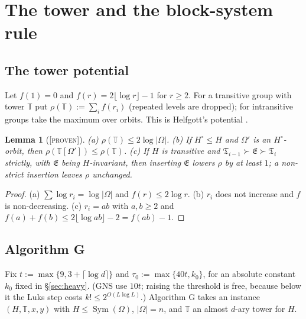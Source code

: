 \documentclass[11pt]{article}
\newtheorem{lemma}[theorem]{Lemma}
\theoremstyle{definition}
\theoremstyle{remark}
\newcommand{\Sym}{\operatorname{Sym}}
\newcommand{\T}{\mathbb T}
\newcommand{\fT}{\mathfrak T}
\newcommand{\fE}{\mathfrak E}
\newcommand{\Proven}{\textsc{[proven]}}
\begin{document}
\section{The tower and the block-system rule}\label{sec:tower}

\subsection{The tower potential}

Let $f(1)=0$ and $f(r)=2\lfloor\log r\rfloor-1$ for $r\ge2$. For a transitive group with tower $\T$ put $\rho(\T):=\sum_i f(r_i)$ (repeated levels are dropped); for intransitive groups take the maximum over orbits. This is Helfgott's potential \cite[Appendix]{HBD}.

\begin{lemma}[\Proven]\label{lem:rho}
\textup{(a)} $\rho(\T)\le 2\log|\Omega|$. \textup{(b)} If $H^\circ\le H$ and $\Omega'$ is an $H^\circ$-orbit, then $\rho(\T[\Omega'])\le\rho(\T)$. \textup{(c)} If $H$ is transitive and $\fT_{i-1}\succ\fE\succ\fT_i$ strictly, with $\fE$ being $H$-invariant, then inserting $\fE$ lowers $\rho$ by at least $1$; a non-strict insertion leaves $\rho$ unchanged.
\end{lemma}
\begin{proof}
(a) $\sum\log r_i=\log|\Omega|$ and $f(r)\le2\log r$. (b) $r_i$ does not increase and $f$ is non-decreasing. (c) $r_i=ab$ with $a,b\ge2$ and $f(a)+f(b)\le 2\lfloor\log ab\rfloor-2=f(ab)-1$.
\end{proof}

\subsection{Algorithm G}\label{sec:algG}

Fix $t:=\max\{9,3+\lceil\log d\rceil\}$ and $\tau_0:=\max\{40t,k_0\}$, for an absolute constant $k_0$ fixed in \S\ref{sec:heavy}. (GNS use $10t$; raising the threshold is free, because below it the Luks step costs $k!\le 2^{O(L\log L)}$.) Algorithm G takes an instance $(H,\T,x,y)$ with $H\le\Sym(\Omega)$, $|\Omega|=n$, and $\T$ an almost $d$-ary tower for $H$.
\end{document}
